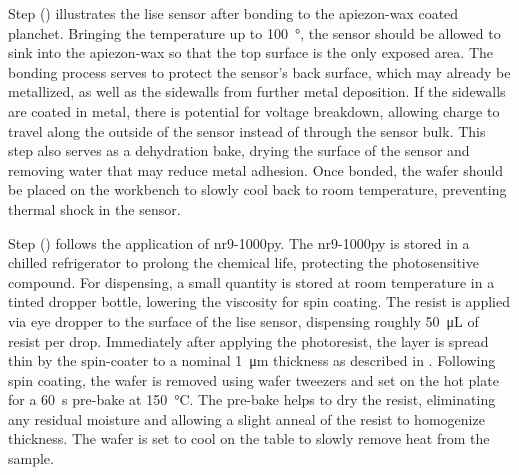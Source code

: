 \documentclass[../../main.tex]{subfiles}
\begin{document}
    \par%
    Step () illustrates the \gls{lise} sensor after bonding to the \gls{apiezon-wax} coated planchet.
    Bringing the temperature up to \SI{100}{\degree}, the sensor should be allowed to sink into the \gls{apiezon-wax} so that the top surface is the only exposed area.
    The bonding process serves to protect the sensor's back surface, which may already be metallized, as well as the sidewalls from further metal deposition.
    If the sidewalls are coated in metal, there is potential for voltage breakdown, allowing charge to travel along the outside of the sensor instead of through the sensor bulk.
    This step also serves as a dehydration bake, drying the surface of the sensor and removing water that may reduce metal adhesion.
    Once bonded, the wafer should be placed on the workbench to slowly cool back to room temperature, preventing thermal shock in the sensor.
    \par%
    Step () follows the application of \gls{nr9-1000py}.
    The \gls{nr9-1000py} is stored in a chilled refrigerator to prolong the chemical life, protecting the photosensitive compound.
    For dispensing, a small quantity is stored at room temperature in a tinted dropper bottle, lowering the viscosity for spin coating.
    The resist is applied via eye dropper to the surface of the \gls{lise} sensor, dispensing roughly \SI{50}{\micro\liter} of resist per drop.
    Immediately after applying the photoresist, the layer is spread thin by the \gls{spin-coater} to a nominal \SI{1}{\micro\meter} thickness as described in .
    Following spin coating, the wafer is removed using wafer tweezers and set on the hot plate for a \SI{60}{\second} pre-bake at \SI{150}{\celsius}.
    The pre-bake helps to dry the resist, eliminating any residual moisture and allowing a slight anneal of the resist to homogenize thickness.
    The wafer is set to cool on the table to slowly remove heat from the sample.
    \par%
\end{document}
